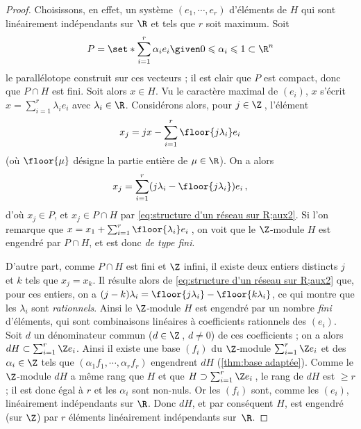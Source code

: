 \documentclass[11pt, %
  title in boldface,
  theorem in new line,
  theorem numbering = section,
  number theorems separately,
  simple name,
]{beaulivre}
\begin{document}
    \begin{proof}
        Choisissons, en effet, un système \( (e_1, \cdots, e_r) \) d'éléments de \( H \) qui sont linéairement indépendants sur \( \R \) et tels que \( r \) soit maximum. Soit
        \begin{equation}\label{eq:structure d'un réseau sur R;aux1}
            P = \set*{ \sum_{i=1}^r \alpha_i e_i \given 0 \leqslant \alpha_i \leqslant 1 } \subset \R^n
        \end{equation}
        le parallélotope construit sur ces vecteurs ; il est clair que \( P \) est compact, donc que \( P \cap H \) est fini. Soit alors \( x \in H \). Vu le caractère maximal de \( (e_i) \), \( x \) s'écrit \( x = \sum_{i=1}^r \lambda_i e_i \) avec \( \lambda_i \in \R \). Considérons alors, pour \( j \in \Z \)\,, l'élément
        \begin{equation}\label{eq:structure d'un réseau sur R;aux2}
            x_j = jx - \sum_{i=1}^r \floor{j\lambda_i} e_i
        \end{equation}
        (où \( \floor{\mu} \) désigne la partie entière de \( \mu \in \R \)). On a alors
        \[
            x_j = \sum_{i=1}^r (j \lambda_i - \floor{j\lambda_i}) e_i \,,
        \]
        d'où \( x_j \in P \), et \( x_j \in P \cap H \) par \eqref{eq:structure d'un réseau sur R;aux2}. Si l'on remarque que \( x = x_1 + \sum_{i=1}^r \floor{\lambda_i} e_i \)\,, on voit que le \( \Z \)‑module \( H \) est engendré par \( P \cap H \), et est donc \emph{de type fini}.

        D'autre part, comme \( P \cap H \) est fini et \( \Z \) infini, il existe deux entiers distincts \( j \) et \( k \) tels que \( x_j = x_k \). Il résulte alors de \eqref{eq:structure d'un réseau sur R;aux2} que, pour ces entiers, on a \( (j-k) \lambda_i = \floor{j\lambda_i} - \floor{k\lambda_i} \), ce qui montre que les \( \lambda_i \) sont \emph{rationnels}. Ainsi le \( \Z \)‑module \( H \) est engendré par un nombre \emph{fini} d'éléments, qui sont combinaisons linéaires à coefficients rationnels des \( (e_i) \). Soit \( d \) un dénominateur commun (\( d \in \Z \)\,, \( d \neq 0 \)) de ces coefficients ; on a alors \( d H \subset \sum_{i=1}^r \Z e_i \). Ainsi il existe une base \( (f_i) \) du \( \Z \)‑module \( \sum_{i=1}^r \Z e_i \) et des \( \alpha_i \in \Z \) tels que \( (\alpha_1 f_1, \cdots, \alpha_r f_r) \) engendrent \( dH \) (\cref{thm:base adaptée}). Comme le \( \Z \)‑module \( dH \) a même rang que \( H \) et que \( H \supset \sum_{i=1}^r \Z e_i \)\,, le rang de \( dH \) est \( \geqslant r \) ; il est donc égal à \( r \) et les \( \alpha_i \) sont non-nuls. Or les \( (f_i) \) sont, comme les \( (e_i) \), linéairement indépendants sur \( \R \). Donc \( dH \), et par conséquent \( H \), est engendré (sur \( \Z \)) par \( r \) éléments linéairement indépendants sur~\( \R \).
    \end{proof}
\end{document}
